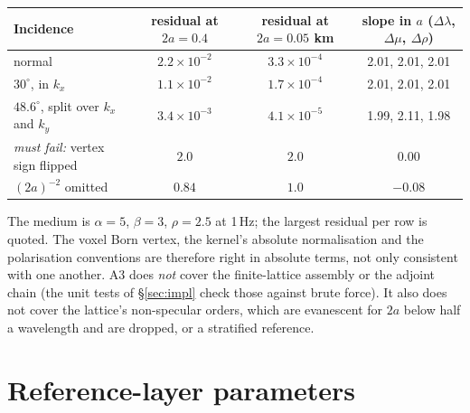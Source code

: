 \documentclass[11pt,a4paper]{article}
\begin{document}
\begin{center}
\small
\setlength{\tabcolsep}{4pt}\begin{tabular}{@{}lccc@{}}
\toprule
Incidence & residual at $2a=0.4$ & residual at $2a=0.05$ km & slope in $a$ ($\Delta\lambda$, $\Delta\mu$, $\Delta\rho$) \\
\midrule
normal & $2.2\times10^{-2}$ & $3.3\times10^{-4}$ & 2.01, 2.01, 2.01 \\
$30^\circ$, in $k_x$ & $1.1\times10^{-2}$ & $1.7\times10^{-4}$ & 2.01, 2.01, 2.01 \\
$48.6^\circ$, split over $k_x$ and $k_y$ & $3.4\times10^{-3}$ & $4.1\times10^{-5}$ & 1.99, 2.11, 1.98 \\
\midrule
\emph{must fail:} vertex sign flipped & $2.0$ & $2.0$ & 0.00 \\
\quad $(2a)^{-2}$ omitted & $0.84$ & $1.0$ & $-0.08$ \\
\bottomrule
\end{tabular}
\end{center}

\noindent The medium is $\alpha=5$, $\beta=3$, $\rho=2.5$ at 1\,Hz; the largest residual per row is
quoted. The voxel Born vertex, the kernel's absolute normalisation and the polarisation conventions
are therefore right in absolute terms, not only consistent with one another. A3 does \emph{not}
cover the finite-lattice assembly or the adjoint chain (the unit tests of \S\ref{sec:impl} check
those against brute force). It also does not cover the lattice's non-specular orders, which are
evanescent for $2a$ below half a wavelength and are dropped, or a stratified reference.

\section{Reference-layer parameters}\label{sec:ref}
\end{document}
